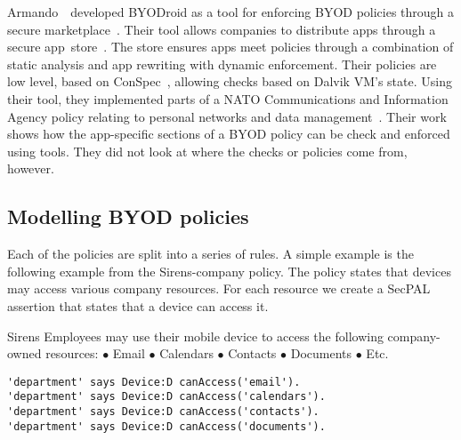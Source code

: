 \documentclass[thesis.tex]{subfiles}
\begin{document}
Armando~\etal~developed BYODroid as a tool for enforcing BYOD policies through a
secure marketplace~\cite{armando_bring_2013}. Their tool allows companies to
distribute apps through a secure app~store~\cite{armando_enabling_2014}. The
store ensures apps meet policies through a combination of static analysis and
app rewriting with dynamic enforcement. Their policies are low level, based on
ConSpec~\cite{aktug_conspec_2008}, allowing checks based on Dalvik VM's state.
Using their tool, they implemented parts of a NATO Communications and
Information Agency policy relating to personal networks and data
management~\cite{armando_developing_2016}. Their work shows how the app-specific
sections of a BYOD policy can be check and enforced using tools. They did not
look at where the checks or policies come from, however.


\subsection{Modelling BYOD policies}

Each of the policies are split into a series of rules.
A simple example is the following example from the Sirens-company policy.
The policy states that devices may access various company resources.
For each resource we create a SecPAL assertion that states that a device can access it.
\begin{policyrule}{Sirens}
  Employees may use their mobile device to access the following company-owned resources:
  \newline $\bullet$ Email $\bullet$ Calendars $\bullet$ Contacts $\bullet$ Documents $\bullet$ Etc.
  \begin{lstlisting}
'department' says Device:D canAccess('email').
'department' says Device:D canAccess('calendars').
'department' says Device:D canAccess('contacts').
'department' says Device:D canAccess('documents').
  \end{lstlisting}
\end{policyrule}
\end{document}
